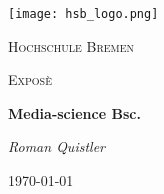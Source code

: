 \begin{titlepage}
	\centering
	\texttt{[image: hsb\_logo.png]}
	\par\vspace{1cm}
	{\scshape\LARGE Hochschule Bremen \par}
	\vspace{1cm}
	{\scshape\Large Exposè \par}
	\vspace{1.5cm}
	{\huge\bfseries Media-science Bsc.\par}
	\vspace{2cm}
	{\Large\itshape Roman Quistler \par}
	\vfill

	\vfill

	{\large \today\par}
\end{titlepage}